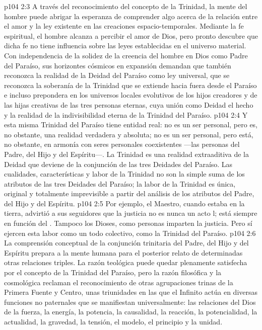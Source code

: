 \vs p104 2:3 A través del reconocimiento del concepto de la Trinidad, la mente del hombre puede abrigar la esperanza de comprender algo acerca de la relación entre el amor y la ley existente en las creaciones espacio\hyp{}temporales. Mediante la fe espiritual, el hombre alcanza a percibir el amor de Dios, pero pronto descubre que dicha fe no tiene influencia sobre las leyes establecidas en el universo material. Con independencia de la solidez de la creencia del hombre en Dios como Padre del Paraíso, sus horizontes cósmicos en expansión demandan que también reconozca la realidad de la Deidad del Paraíso como ley universal, que se reconozca la soberanía de la Trinidad que se extiende hacia fuera desde el Paraíso e incluso prepondera en los universos locales evolutivos de los hijos creadores y de las hijas creativas de las tres personas eternas, cuya unión como Deidad  el hecho y la realidad de la indivisibilidad eterna de la Trinidad del Paraíso.
\vs p104 2:4 Y esta misma Trinidad del Paraíso tiene entidad real: no es un ser personal, pero es, no obstante, una realidad verdadera y absoluta; no es un ser personal, pero está, no obstante, en armonía con seres personales coexistentes ---las personas del Padre, del Hijo y del Espíritu---. La Trinidad es una realidad extraaditiva de la Deidad que deviene de la conjunción de las tres Deidades del Paraíso. Las cualidades, características y labor de la Trinidad no son la simple suma de los atributos de las tres Deidades del Paraíso; la labor de la Trinidad es única, original y totalmente imprevisible a partir del análisis de los atributos del Padre, del Hijo y del Espíritu.
\vs p104 2:5 Por ejemplo, el Maestro, cuando estaba en la tierra, advirtió a sus seguidores que la justicia no es nunca un acto l; está siempre en función del . Tampoco los Dioses, como personas imparten la justicia. Pero sí ejercen esta labor como un todo colectivo, como la Trinidad del Paraíso.
\vs p104 2:6 La comprensión conceptual de la conjunción trinitaria del Padre, del Hijo y del Espíritu prepara a la mente humana para el posterior relato de determinadas otras relaciones triples. La razón teológica puede quedar plenamente satisfecha por el concepto de la Trinidad del Paraíso, pero la razón filosófica y la cosmológica reclaman el reconocimiento de otras agrupaciones trinas de la Primera Fuente y Centro, unas triunidades en las que el Infinito actúa en diversas funciones no paternales que se manifiestan universalmente: las relaciones del Dios de la fuerza, la energía, la potencia, la causalidad, la reacción, la potencialidad, la actualidad, la gravedad, la tensión, el modelo, el principio y la unidad.
